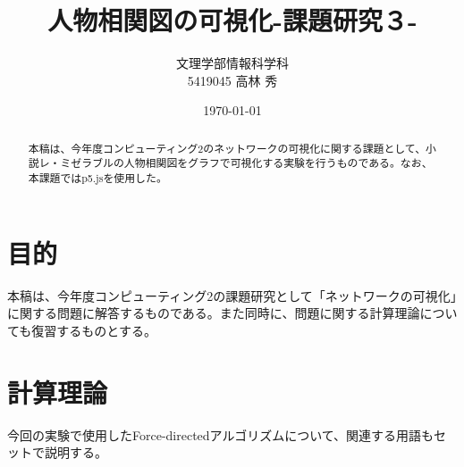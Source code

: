 \documentclass[dvipdfmx]{jsarticle}
\title{人物相関図の可視化-課題研究３-}
\author{文理学部情報科学科\\5419045 高林 秀}
\date{\today}
\begin{document}
\maketitle

\begin{abstract}
本稿は、今年度コンピューティング2のネットワークの可視化に関する課題として、小説レ・ミゼラブルの人物相関図をグラフで可視化する実験を行うものである。なお、本課題ではp5.jsを使用した。
\end{abstract}

\section{目的}
本稿は、今年度コンピューティング2の課題研究として「ネットワークの可視化」に関する問題に解答するものである。また同時に、問題に関する計算理論についても復習するものとする。
\section{計算理論}
今回の実験で使用したForce-directedアルゴリズムについて、関連する用語もセットで説明する。
\end{document}
